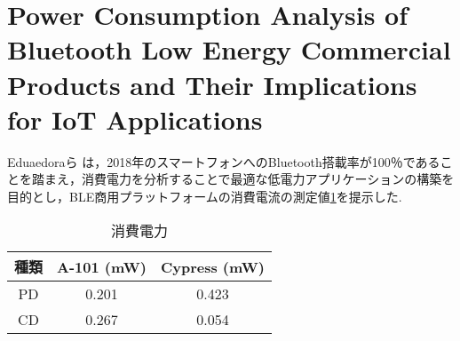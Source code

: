 \section{Power Consumption Analysis of Bluetooth Low Energy Commercial Products and Their Implications for IoT Applications}
Eduaedoraら は，2018年のスマートフォンへのBluetooth搭載率が100％であることを踏まえ，消費電力を分析することで最適な低電力アプリケーションの構築を目的とし，BLE商用プラットフォームの消費電流の測定値\ref{fig:power_consumption}を提示した\cite{Garcia-Espinosa2018}.

\begin{table}
    \raggedleft
    \caption{消費電力}
    \label{fig:power_consumption}
    \centering
    \begin{tabular}{|c|c|c|}
    \hline
    \textbf{種類} & \textbf{A-101 (mW)} & \textbf{Cypress (mW)} \\ \hline
    PD          & 0.201               & 0.423                 \\ \hline
    CD          & 0.267               & 0.054                 \\ \hline
    \end{tabular}
\end{table}